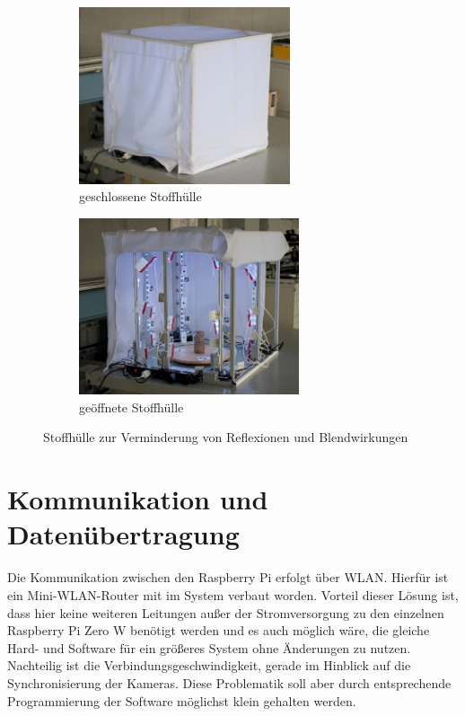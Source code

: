 \documentclass[./00PhotoBox.tex]{subfiles}
\begin{document}
\begin{figure}
    \centering
    \begin{subfigure}{0.45\textwidth}
        \includegraphics[height=5.2cm]{./img/3_aufbau/stoffhuelle.jpg}
        \centering
        \caption{geschlossene Stoffhülle}
        \label{img:stoffhuelle}
    \end{subfigure}
    \begin{subfigure}{0.45\textwidth}
        \includegraphics[height=5.2cm]{./img/3_aufbau/stoffhuelle_offen.jpg}
        \centering
        \caption{geöffnete Stoffhülle}
        \label{img:stoffhuelle_offen}
    \end{subfigure}
    \caption{Stoffhülle zur Verminderung von Reflexionen und Blendwirkungen}
\end{figure}

\section{Kommunikation und Datenübertragung}
Die Kommunikation zwischen den Raspberry Pi erfolgt über WLAN. Hierfür ist ein Mini-WLAN-Router mit im System verbaut worden. Vorteil dieser Lösung ist, dass hier keine weiteren Leitungen außer der Stromversorgung zu den einzelnen Raspberry Pi Zero W benötigt werden und es auch möglich wäre, die gleiche Hard- und Software für ein größeres System ohne Änderungen zu nutzen. Nachteilig ist die Verbindungsgeschwindigkeit, gerade im Hinblick auf die Synchronisierung der Kameras. Diese Problematik soll aber durch entsprechende Programmierung der Software möglichst klein gehalten werden.
\end{document}
